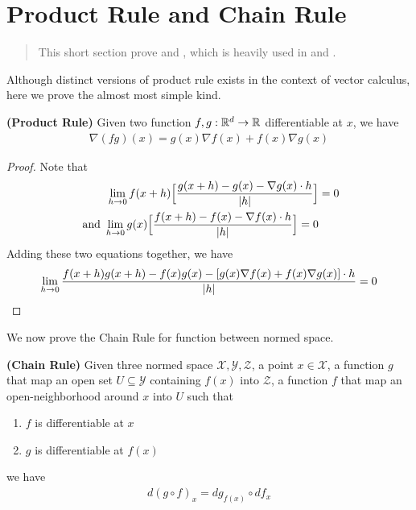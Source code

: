 \documentclass{report}
\begin{document}
\section{Product Rule and Chain Rule}
\begin{abstract}
This short section prove  and  , which is heavily used in  and . 
\end{abstract}
\begin{mdframed}
Although distinct versions of product rule exists in the context of vector calculus, here we prove the almost most simple kind.  
\end{mdframed}
\begin{theorem}
\label{Product Rule}
\textbf{(Product Rule)} Given two function  $f,g:\mathbb{R}^d\rightarrow \mathbb{R}$ differentiable at $x$, we have 
\begin{align*}
\nabla (fg)(x)= g(x) \nabla f(x)+ f(x)\nabla g(x)
\end{align*}
\end{theorem}
\begin{proof}
Note that 
\begin{align*}
  \lim_{h\to 0}f(x+h)\Big[\frac{g(x+h)-g(x)-\nabla g(x)\cdot h}{\left|h\right|} \Big]&= 0 \\
  \text{ and }\lim_{h\to 0} g(x)\Big[ \frac{f(x+h)-f(x)-\nabla f(x)\cdot h}{\left|h\right|}\Big]=0
\end{align*}
Adding these two equations together, we have 
\begin{align*}
\lim_{h\to 0}  \frac{f(x+h)g(x+h)-f(x)g(x)-[g(x)\nabla f(x)+f(x)\nabla g(x)]\cdot h}{\left|h\right|}=0
\end{align*}
\end{proof}
\begin{mdframed}
We now prove the Chain Rule for function between normed space. 
\end{mdframed}
\begin{theorem}
\label{CR}
\textbf{(Chain Rule)} Given three normed space $\mathcal{X},\mathcal{Y},\mathcal{Z}$, a point $x \in \mathcal{X}$, a function $g$ that map an open set $U\subseteq \mathcal{Y}$ containing $f(x)$ into $\mathcal{Z}$, a function $f$ that map an open-neighborhood around $x$ into $U$ such that 
\begin{enumerate}[label=(\alph*)]
  \item $f$ is differentiable at $x$
   \item $g$ is differentiable at $f(x)$
\end{enumerate}
we have 
\begin{align*}
d(g\circ f)_x=dg_{f(x)}\circ df_{x}
\end{align*}
\end{theorem}
\end{document}
